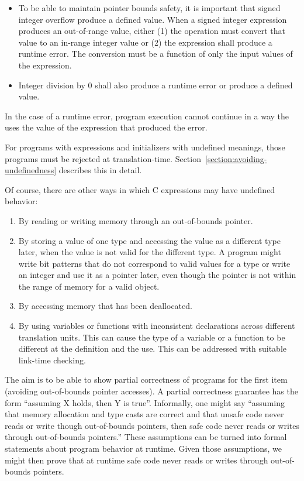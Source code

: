 \begin{itemize}
\item
  To be able to maintain pointer bounds safety, it is important that
  signed integer overflow produce a defined value. When a signed integer
  expression produces an out-of-range value, either (1) the operation
  must convert that value to an in-range integer value or (2) the
  expression shall produce a runtime error. The conversion must be a
  function of only the input values of the expression.
\item
  Integer division by 0 shall also produce a runtime error or produce a
  defined value.
\end{itemize}

In the case of a runtime error, program execution cannot continue in a
way the uses the value of the expression that produced the error.

For programs with expressions and initializers with undefined meanings,
those programs must be rejected at translation-time. 
Section~\ref{section:avoiding-undefinedness}
describes this in detail.

Of course, there are other ways in which C expressions may have
undefined behavior:

\begin{enumerate}
\item
  By reading or writing memory through an out-of-bounds pointer.
\item
  By storing a value of one type and accessing the value as a different
  type later, when the value is not valid for the different type. A
  program might write bit patterns that do not correspond to valid
  values for a type or write an integer and use it as a pointer later,
  even though the pointer is not within the range of memory for a valid
  object.
\item
  By accessing memory that has been deallocated.
\item
  By using variables or functions with inconsistent declarations across
  different translation units. This can cause the type of a variable or
  a function to be different at the definition and the use. This can be
  addressed with suitable link-time checking.
\end{enumerate}

The aim is to be able to show partial correctness of programs for the
first item (avoiding out-of-bounds pointer accesses). A
partial correctness guarantee has the form ``assuming X holds, then Y is
true''. Informally, one might say ``assuming that memory allocation and
type casts are correct and that unsafe code never reads or write though
out-of-bounds pointers, then safe code never reads or writes through
out-of-bounds pointers.'' These assumptions can be turned into formal
statements about program behavior at runtime. Given those assumptions,
we might then prove that at runtime safe code never reads or writes
through out-of-bounds pointers.
